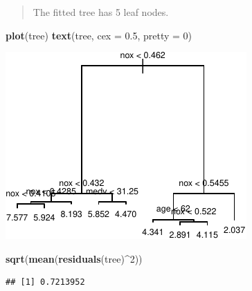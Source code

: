 \documentclass[]{article}
\newenvironment{Shaded}{\begin{snugshade}}{\end{snugshade}}
\newcommand{\DataTypeTok}[1]{\textcolor[rgb]{0.13,0.29,0.53}{#1}}
\newcommand{\DecValTok}[1]{\textcolor[rgb]{0.00,0.00,0.81}{#1}}
\newcommand{\FloatTok}[1]{\textcolor[rgb]{0.00,0.00,0.81}{#1}}
\newcommand{\KeywordTok}[1]{\textcolor[rgb]{0.13,0.29,0.53}{\textbf{#1}}}
\newcommand{\NormalTok}[1]{#1}
\newcommand{\OperatorTok}[1]{\textcolor[rgb]{0.81,0.36,0.00}{\textbf{#1}}}
\newcommand{\StringTok}[1]{\textcolor[rgb]{0.31,0.60,0.02}{#1}}
\begin{document}
\begin{quote}
The fitted tree has 5 leaf nodes.
\end{quote}

\begin{Shaded}
\begin{Highlighting}[]
\KeywordTok{plot}\NormalTok{(tree)}
\KeywordTok{text}\NormalTok{(tree, }\DataTypeTok{cex =} \FloatTok{0.5}\NormalTok{, }\DataTypeTok{pretty =} \DecValTok{0}\NormalTok{)}
\end{Highlighting}
\end{Shaded}

\begin{center}\includegraphics{sol_A4_files/figure-latex/unnamed-chunk-11-1} \end{center}

\begin{Shaded}
\begin{Highlighting}[]
\KeywordTok{sqrt}\NormalTok{(}\KeywordTok{mean}\NormalTok{(}\KeywordTok{residuals}\NormalTok{(tree)}\OperatorTok{^}\DecValTok{2}\NormalTok{))}
\end{Highlighting}
\end{Shaded}

\begin{verbatim}
## [1] 0.7213952
\end{verbatim}

\begin{Shaded}
\end{Shaded}
\end{document}
